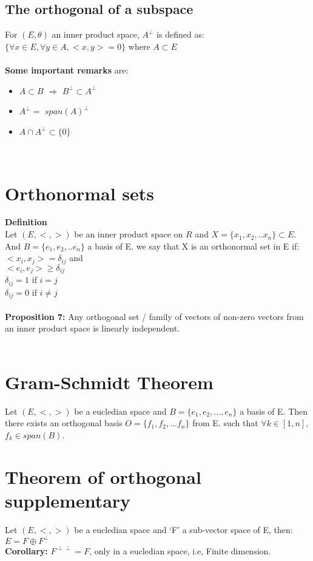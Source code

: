 \documentclass{article}
\begin{document}
\subsection{The orthogonal of a subspace}
For $(E, \theta)$ an inner product space, $A^{\perp}$ is defined as:\\
$\{ \forall x \in E, \forall y \in A, <x,y> = 0\}$ where $A \subset E$\\
\\
\textbf{Some important remarks} are:\\
\begin{itemize}
    \item $A \subset B$ $\Rightarrow$ $B^{\perp} \subset A^{\perp}$
    \item $A^{\perp} = $ $span(A)^{\perp}$
    \item $A \cap A^{\perp} \subset \{ 0 \} $
\end{itemize}
\\
\section{Orthonormal sets}
\textbf{Definition}\\
Let $(E, <,>)$ be an inner product space on $ R $ and $ X = \{ x_{1}, x_{2}, .. x_{n} \} \subset E $. And $ B = \{ e_{1}, e_{2}, .. e_{n} \} $ a basis of E. we say that X is an orthonormal set in E if:\\
$ <x_{i}, x_{j}> = \delta_{ij} $ and\\
$ <e_{i}, e_{j}> \geq \delta_{ij} $\\
$ \delta_{ij} = 1 $ if $ i = j $\\
$ \delta_{ij} = 0 $ if $ i \neq j $\\
\\
\textbf{Proposition 7:} Any orthogonal set / family of vectors of non-zero vectors from an inner product space is linearly independent.\\
\\
\section{Gram-Schmidt Theorem}
Let $ (E, <,>) $ be a eucledian space and $ B = \{ e_{1}, e_{2}, ... , e_{n} \} $ a basis of E. Then there exists an orthogonal basis $ O = \{ f_{1}, f_{2}, ... f_{n} \} $ from E. such that $ \forall k \in [1, n] $, $ f_{k} \in span(B) $.
\\
\section{Theorem of orthogonal supplementary}
Let $ (E, <,>) $ be a eucledian space and `F' a sub-vector space of E, then:\\
$ E = F \oplus F^{\perp} $\\
\textbf{Corollary:} $ F^{\perp \perp} = F $, only in a eucledian space, i.e, Finite dimension.\\
\\
\end{document}
